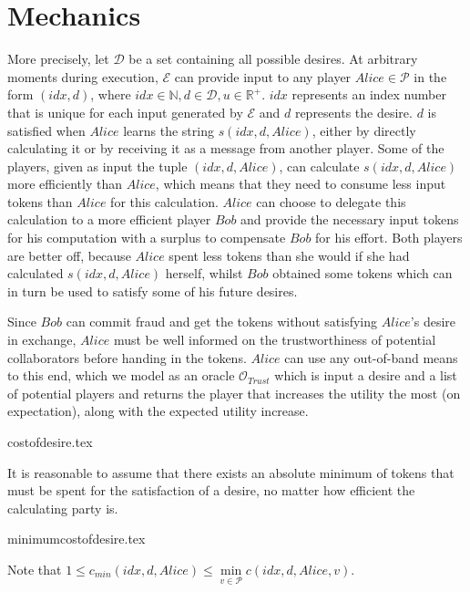 \section{Mechanics}
  More precisely, let $\mathcal{D}$ be a set containing all possible desires. At arbitrary
  moments during execution, $\mathcal{E}$ can provide input to any player $Alice \in
  \mathcal{P}$ in the form $\left(idx, d\right)$, where $idx \in \mathbb{N}, d \in
  \mathcal{D}, u \in \mathbb{R}^{+}$. $idx$ represents an index number that is unique for
  each input generated by $\mathcal{E}$ and $d$ represents the desire. $d$ is satisfied
  when $Alice$ learns the string $s\left(idx, d, Alice\right)$, either by directly
  calculating it or by receiving it as a message from another player. Some of the players,
  given as input the tuple $\left(idx, d, Alice\right)$, can calculate $s\left(idx, d,
  Alice\right)$ more efficiently than $Alice$, which means that they need to consume less
  input tokens than $Alice$ for this calculation. $Alice$ can choose to delegate this
  calculation to a more efficient player $Bob$ and provide the necessary input tokens for
  his computation with a surplus to compensate $Bob$ for his effort. Both players are
  better off, because $Alice$ spent less tokens than she would if she had calculated
  $s\left(idx, d, Alice\right)$ herself, whilst $Bob$ obtained some tokens which can in
  turn be used to satisfy some of his future desires.

  Since $Bob$ can commit fraud and get the tokens without satisfying $Alice$'s desire in
  exchange, $Alice$ must be well informed on the trustworthiness of potential
  collaborators before handing in the tokens. $Alice$ can use any out-of-band means to
  this end, which we model as an oracle $\mathcal{O}_{Trust}$ which is input a desire and
  a list of potential players and returns the player that increases the utility the most
  (on expectation), along with the expected utility increase.

  {costofdesire.tex}

  It is reasonable to assume that there exists an absolute minimum of tokens that must be
  spent for the satisfaction of a desire, no matter how efficient the calculating party
  is.

  {minimumcostofdesire.tex}

  \noindent Note that $1 \leq c_{min}\left(idx, d, Alice\right) \leq \min\limits_{v \in
  \mathcal{P}}{c\left(idx, d, Alice, v\right)}$.

